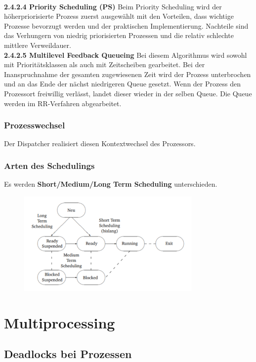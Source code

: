 \documentclass{article}
\begin{document}
    \\
    \textbf{2.4.2.4 Priority Scheduling (PS)}\newline
    Beim Priority Scheduling wird der höherpriorisierte Prozess zuerst ausgewählt mit den Vorteilen, dass wichtige Prozesse bevorzugt werden und der praktischen Implementierung. Nachteile sind das Verhungern von niedrig priorisierten Prozessen und die relativ schlechte mittlere Verweildauer.\newline
    \\
    \textbf{2.4.2.5 Multilevel Feedback Queueing}\newline
    Bei diesem Algorithmus wird sowohl mit Prioritätsklassen als auch mit Zeitscheiben gearbeitet. Bei der Inanspruchnahme der gesamten zugewiesenen Zeit wird der Prozess unterbrochen und an das Ende der nächst niedrigeren Queue gesetzt. Wenn der Prozess den Prozessort freiwillig verlässt, landet dieser wieder in der selben Queue. Die Queue werden im RR-Verfahren abgearbeitet.  
\subsubsection{Prozesswechsel}
    Der Dispatcher realisiert diesen Kontextwechsel des Prozessors.
\subsubsection{Arten des Schedulings}
    Es werden \textbf{Short/Medium/Long Term Scheduling} unterschieden.
    \begin{figure}[H]
        \centering
	    \includegraphics[width=90mm]{Skizzen/2_Kapitel/arten_von_scheduling.png}
    \end{figure}

\newpage
\section{Multiprocessing}
\subsection{Deadlocks bei Prozessen}
\end{document}
